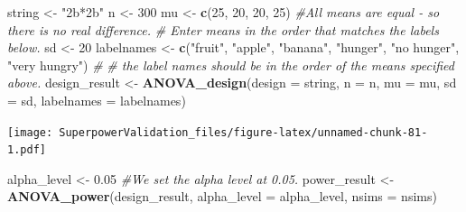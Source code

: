 \documentclass[]{book}
\newenvironment{Shaded}{\begin{snugshade}}{\end{snugshade}}
\newcommand{\CommentTok}[1]{\textcolor[rgb]{0.56,0.35,0.01}{\textit{#1}}}
\newcommand{\DataTypeTok}[1]{\textcolor[rgb]{0.13,0.29,0.53}{#1}}
\newcommand{\DecValTok}[1]{\textcolor[rgb]{0.00,0.00,0.81}{#1}}
\newcommand{\FloatTok}[1]{\textcolor[rgb]{0.00,0.00,0.81}{#1}}
\newcommand{\KeywordTok}[1]{\textcolor[rgb]{0.13,0.29,0.53}{\textbf{#1}}}
\newcommand{\NormalTok}[1]{#1}
\newcommand{\StringTok}[1]{\textcolor[rgb]{0.31,0.60,0.02}{#1}}
\begin{document}
\begin{Shaded}
\begin{Highlighting}[]
\NormalTok{string <-}\StringTok{ "2b*2b"}
\NormalTok{n <-}\StringTok{ }\DecValTok{300}
\NormalTok{mu <-}\StringTok{ }\KeywordTok{c}\NormalTok{(}\DecValTok{25}\NormalTok{, }\DecValTok{20}\NormalTok{, }\DecValTok{20}\NormalTok{, }\DecValTok{25}\NormalTok{) }\CommentTok{#All means are equal - so there is no real difference.}
\CommentTok{# Enter means in the order that matches the labels below.}
\NormalTok{sd <-}\StringTok{ }\DecValTok{20}
\NormalTok{labelnames <-}\StringTok{ }\KeywordTok{c}\NormalTok{(}\StringTok{"fruit"}\NormalTok{, }\StringTok{"apple"}\NormalTok{, }\StringTok{"banana"}\NormalTok{, }\StringTok{"hunger"}\NormalTok{, }\StringTok{"no hunger"}\NormalTok{, }\StringTok{"very hungry"}\NormalTok{) }\CommentTok{#}
\CommentTok{# the label names should be in the order of the means specified above.}
\NormalTok{design_result <-}\StringTok{ }\KeywordTok{ANOVA_design}\NormalTok{(}\DataTypeTok{design =}\NormalTok{ string,}
                   \DataTypeTok{n =}\NormalTok{ n, }
                   \DataTypeTok{mu =}\NormalTok{ mu, }
                   \DataTypeTok{sd =}\NormalTok{ sd, }
                   \DataTypeTok{labelnames =}\NormalTok{ labelnames)}
\end{Highlighting}
\end{Shaded}

\texttt{[image: SuperpowerValidation\_files/figure-latex/unnamed-chunk-81-1.pdf]}

\begin{Shaded}
\begin{Highlighting}[]
\NormalTok{alpha_level <-}\StringTok{ }\FloatTok{0.05} \CommentTok{#We set the alpha level at 0.05. }
\NormalTok{power_result <-}\StringTok{ }\KeywordTok{ANOVA_power}\NormalTok{(design_result, }\DataTypeTok{alpha_level =}\NormalTok{ alpha_level, }\DataTypeTok{nsims =}\NormalTok{ nsims)}
\end{Highlighting}
\end{Shaded}
\end{document}
